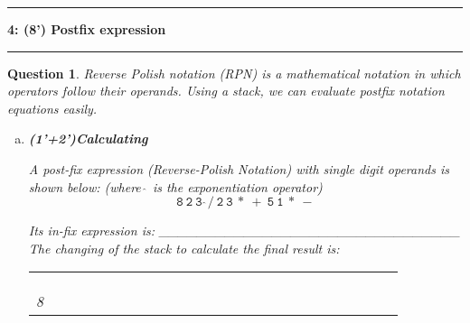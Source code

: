 \documentclass[10.5pt]{article}
\newcommand\question[2]{\vspace{.25in}\hrule\textbf{#1: #2}\vspace{.5em}\hrule\vspace{.10in}}
\newtheorem{Q}{Question}
\begin{document}
	\pagebreak

	\question{4}{(8') Postfix expression}
	\begin{Q}
	Reverse Polish notation (RPN) is a mathematical notation in which operators follow their operands. Using a stack, we can evaluate postfix notation equations easily.
	
	\begin{enumerate}[(a)]
		\item \textbf{(1'+2')Calculating}
		
		A post-fix expression (Reverse-Polish Notation) with single digit operands is shown below: (where $\hat\ $ is the exponentiation operator)\\
		$$\mathtt{8\ 2\ 3\ \hat \ /\ 2\ 3\ *\ +\ 5\ 1\ *\ -}$$
		
		
		Its in-fix expression is: \_\_\_\_\_\_\_\_\_\_\_\_\_\_\_\_\_\_\_\_\_\_\_\_\_\_\_\_\_\_\_\_\\
		The changing of the stack to calculate the final result is:
		\begin{table}[htb]
			\centering\begin{tabular}{|l|l|l|l|l|l|l|l|l|l|l|l|l|l|l|l|l|l|l|l|l|l|l|l|l|}
				\cline{1-1} \cline{3-3} \cline{5-5} \cline{7-7} \cline{9-9} \cline{11-11} \cline{13-13} \cline{15-15} \cline{17-17} \cline{19-19} \cline{21-21} \cline{23-23} \cline{25-25}
				&  &  &  &  &  &  &  &  &  &  &  &  &  &  &  &  &  &  &  &  &  & & &  \\ \cline{1-1} \cline{3-3} \cline{5-5} \cline{7-7} \cline{9-9} \cline{11-11} \cline{13-13} \cline{15-15} \cline{17-17} \cline{19-19} \cline{21-21} \cline{23-23} \cline{25-25}
				&  &  &  &  &  &  &  &  &  &  &  &  &  &  &  &  &  &  &  &  &  & & &  \\ \cline{1-1} \cline{3-3} \cline{5-5} \cline{7-7} \cline{9-9} \cline{11-11} \cline{13-13} \cline{15-15} \cline{17-17} \cline{19-19} \cline{21-21} \cline{23-23} \cline{25-25}
				&  &  &  &  &  &  &  &  &  &  &  &  &  &  &  &  &  &  &  &  &  & & &   \\ \cline{1-1} \cline{3-3} \cline{5-5} \cline{7-7} \cline{9-9} \cline{11-11} \cline{13-13} \cline{15-15} \cline{17-17} \cline{19-19} \cline{21-21} \cline{23-23} \cline{25-25}
				8 &  &  &  &  &  &  &  &  &  &  &  &  &  &  &  &  &  &  &  &  &  & & &  \\ \cline{1-1} \cline{3-3} \cline{5-5} \cline{7-7} \cline{9-9} \cline{11-11} \cline{13-13} \cline{15-15} \cline{17-17} \cline{19-19} \cline{21-21} \cline{23-23} \cline{25-25}
			\end{tabular}
		\end{table}


\end{enumerate}
\end{Q}
\end{document}
